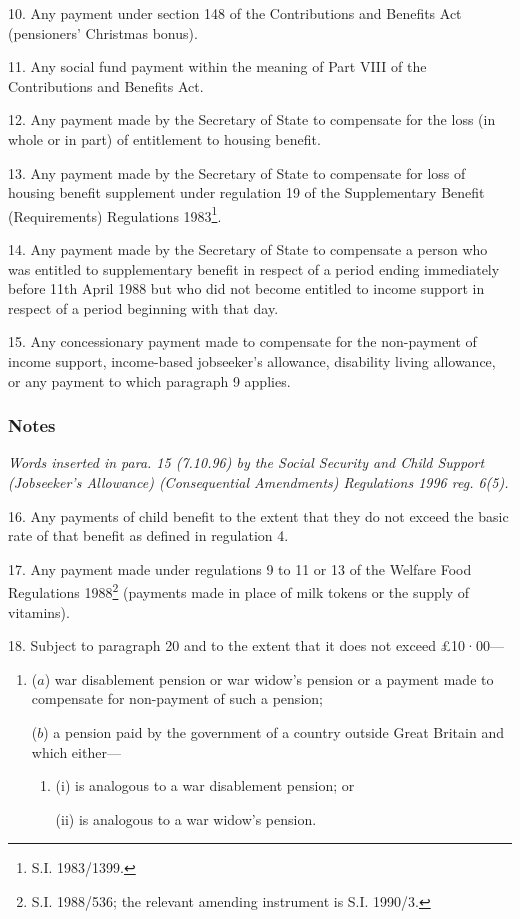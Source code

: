 \documentclass[a4paper]{article}
\newcommand\amendment[1]{\subsubsection*{Notes}{\itshape\frenchspacing\footnotesize #1 \par\goodbreak}}
\begin{document}
\medskip

10.  Any payment under section 148 of the Contributions and Benefits Act (pensioners' Christmas bonus).

\medskip

11.  Any social fund payment within the meaning of Part VIII of the Contributions and Benefits Act.

\medskip

12.  Any payment made by the Secretary of State to compensate for the loss (in whole or in part) of entitlement to housing benefit.

\medskip

13.  Any payment made by the Secretary of State to compensate for loss of housing benefit supplement under regulation 19 of the Supplementary Benefit (Requirements) Regulations 1983\footnote{\frenchspacing S.I. 1983/1399.}.

\medskip

14.  Any payment made by the Secretary of State to compensate a person who was entitled to supplementary benefit in respect of a period ending immediately before 11th April 1988 but who did not become entitled to income support in respect of a period beginning with that day.

\medskip

15.  Any concessionary payment made to compensate for the non-payment of income support, 
income-based jobseeker’s allowance,  %
disability living allowance, or any payment to which paragraph 9 applies.

\amendment{
Words inserted in para. 15 (7.10.96) by the Social Security and Child Support (Jobseeker's Allowance) (Consequential Amendments) Regulations 1996 reg. 6(5).
}

\medskip

16.  Any payments of child benefit to the extent that they do not exceed the basic rate of that benefit as defined in regulation 4.

\medskip

17.  Any payment made under regulations 9 to 11 or 13 of the Welfare Food Regulations 1988\footnote{\frenchspacing S.I. 1988/536; the relevant amending instrument is S.I. 1990/3.} (payments made in place of milk tokens or the supply of vitamins).

\medskip

18.  Subject to paragraph 20 and to the extent that it does not exceed £10·00—
\begin{enumerate}\item[]
($a$) war disablement pension or war widow’s pension or a payment made to compensate for non-payment of such a pension;

($b$) a pension paid by the government of a country outside Great Britain and which either—
\begin{enumerate}\item[]
(i) is analogous to a war disablement pension; or

(ii) is analogous to a war widow’s pension.
\end{enumerate}
\end{enumerate}
\end{document}
